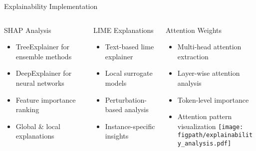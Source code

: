 \begin{frame}{Explainability Implementation}
\begin{columns}
\begin{column}{0.33\textwidth}
\begin{block}{SHAP Analysis}
\begin{itemize}
    \item TreeExplainer for ensemble methods
    \item DeepExplainer for neural networks
    \item Feature importance ranking
    \item Global \& local explanations
\end{itemize}
\end{block}
\end{column}

\begin{column}{0.33\textwidth}
\begin{block}{LIME Explanations}
\begin{itemize}
    \item Text-based lime explainer
    \item Local surrogate models
    \item Perturbation-based analysis
    \item Instance-specific insights
\end{itemize}
\end{block}
\end{column}

\begin{column}{0.33\textwidth}
\begin{block}{Attention Weights}
\begin{itemize}
    \item Multi-head attention extraction
    \item Layer-wise attention analysis
    \item Token-level importance
    \item Attention pattern visualization
    \texttt{[image: \\figpath/explainability\_analysis.pdf]}
\end{itemize}
\end{block}
\end{column}
\end{columns}
\end{frame}

